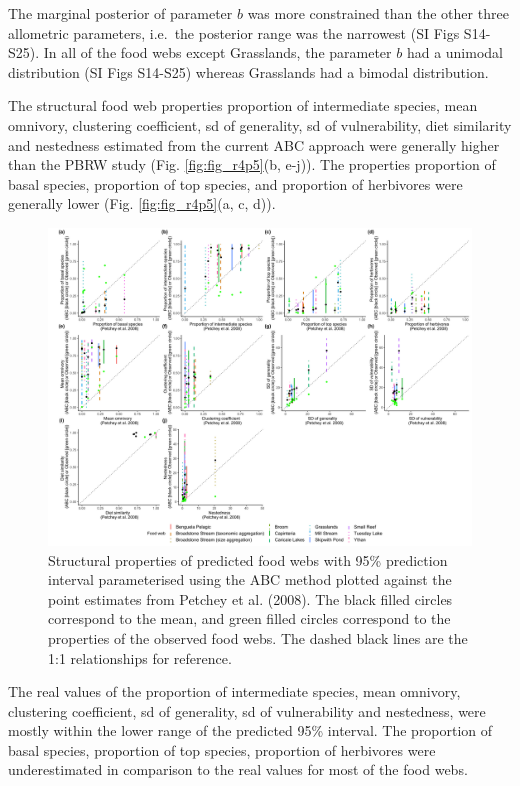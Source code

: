 \documentclass{article}
\begin{document}
The marginal posterior of parameter \(b\) was more constrained than the
other three allometric parameters, i.e.~the posterior range was the
narrowest (SI Figs S14-S25). In all of the food webs except Grasslands,
the parameter \(b\) had a unimodal distribution (SI Figs S14-S25)
whereas Grasslands had a bimodal distribution.

The structural food web properties proportion of intermediate species,
mean omnivory, clustering coefficient, sd of generality, sd of
vulnerability, diet similarity and nestedness estimated from the current
ABC approach were generally higher than the PBRW study (Fig.
\ref{fig:fig_r4p5}(b, e-j)). The properties proportion of basal species,
proportion of top species, and proportion of herbivores were generally
lower (Fig. \ref{fig:fig_r4p5}(a, c, d)).

\begin{figure}

{\centering \includegraphics[width=500px]{../results/misc/r_properties_ABC_vs_petchey_TSS_lower_a} 

}

\caption{\label{fig:fig_r4p5} Structural properties of predicted food webs with 95\% prediction interval parameterised using the ABC method plotted against the point estimates from Petchey et al. (2008). The black filled circles correspond to the mean, and green filled circles correspond to the properties of the observed food webs. The dashed black lines are the 1:1 relationships for reference.}\label{fig:unnamed-chunk-8}
\end{figure}

The real values of the proportion of intermediate species, mean
omnivory, clustering coefficient, sd of generality, sd of vulnerability
and nestedness, were mostly within the lower range of the predicted 95\%
interval. The proportion of basal species, proportion of top species,
proportion of herbivores were underestimated in comparison to the real
values for most of the food webs.
\end{document}

